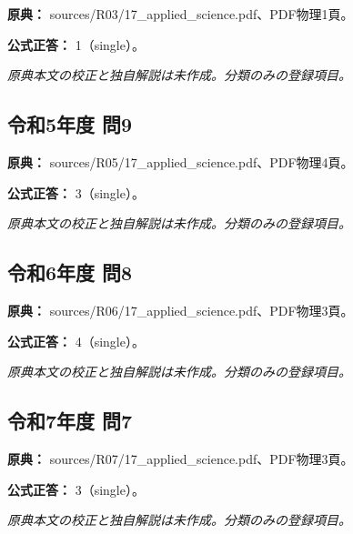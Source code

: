 \noindent\textbf{原典：} sources/R03/17\_applied\_science.pdf、PDF物理1頁。

\textbf{公式正答：} 1（single）。

\par\textit{原典本文の校正と独自解説は未作成。分類のみの登録項目。}

\subsection{令和5年度 問9}
\label{q:r05-reg-applied-09}

\noindent\textbf{原典：} sources/R05/17\_applied\_science.pdf、PDF物理4頁。

\textbf{公式正答：} 3（single）。

\par\textit{原典本文の校正と独自解説は未作成。分類のみの登録項目。}

\subsection{令和6年度 問8}
\label{q:r06-reg-applied-08}

\noindent\textbf{原典：} sources/R06/17\_applied\_science.pdf、PDF物理3頁。

\textbf{公式正答：} 4（single）。

\par\textit{原典本文の校正と独自解説は未作成。分類のみの登録項目。}

\subsection{令和7年度 問7}
\label{q:r07-reg-applied-07}

\noindent\textbf{原典：} sources/R07/17\_applied\_science.pdf、PDF物理3頁。

\textbf{公式正答：} 3（single）。

\par\textit{原典本文の校正と独自解説は未作成。分類のみの登録項目。}
